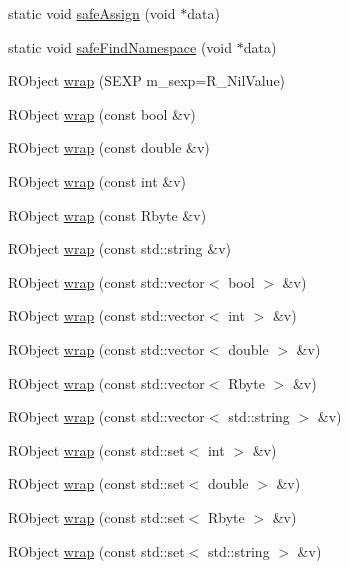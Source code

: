 \begin{DoxyCompactItemize}
\item 
static void \hyperlink{namespaceRcpp_a2d80463328ec91b260619bbe65c50f5e}{safeAssign} (void $\ast$data)
\item 
static void \hyperlink{namespaceRcpp_a669f9e0719ba170ec1b3b5dd2ba45406}{safeFindNamespace} (void $\ast$data)
\item 
RObject \hyperlink{namespaceRcpp_aa47be58d105b733ced235de53b5691af}{wrap} (SEXP m\_\-sexp=R\_\-NilValue)
\item 
RObject \hyperlink{namespaceRcpp_afec8977a6c3fcfc0ab37a9e2a7ba9657}{wrap} (const bool \&v)
\item 
RObject \hyperlink{namespaceRcpp_a4736ca32ac9aef778a1cddf60171fd9c}{wrap} (const double \&v)
\item 
RObject \hyperlink{namespaceRcpp_a0a7e3f2732cf247f3d1f0bf005fe5ad9}{wrap} (const int \&v)
\item 
RObject \hyperlink{namespaceRcpp_a81f3e14c61a58be59803f3100700ea94}{wrap} (const Rbyte \&v)
\item 
RObject \hyperlink{namespaceRcpp_a4d366d399dd494d6790a4c18def9e9a9}{wrap} (const std::string \&v)
\item 
RObject \hyperlink{namespaceRcpp_aa6bc1230d4222365a0ffe0af4cf7fe1a}{wrap} (const std::vector$<$ bool $>$ \&v)
\item 
RObject \hyperlink{namespaceRcpp_ac7ca672bde8965aacab47395102069e4}{wrap} (const std::vector$<$ int $>$ \&v)
\item 
RObject \hyperlink{namespaceRcpp_add0776494532ff31ee34f89ead80b15f}{wrap} (const std::vector$<$ double $>$ \&v)
\item 
RObject \hyperlink{namespaceRcpp_a8dfe3bacd7033e5edcc9341a8de47132}{wrap} (const std::vector$<$ Rbyte $>$ \&v)
\item 
RObject \hyperlink{namespaceRcpp_a054f4cfb15317bdce6b30efa30f0e2ea}{wrap} (const std::vector$<$ std::string $>$ \&v)
\item 
RObject \hyperlink{namespaceRcpp_af1fb1519713bb98d753ce69fe55b9b7d}{wrap} (const std::set$<$ int $>$ \&v)
\item 
RObject \hyperlink{namespaceRcpp_ad3b81d79ed0de1834ea38f995ad39f31}{wrap} (const std::set$<$ double $>$ \&v)
\item 
RObject \hyperlink{namespaceRcpp_ab9e1f40cf7583da1f54a8e6c5f7e9f3a}{wrap} (const std::set$<$ Rbyte $>$ \&v)
\item 
RObject \hyperlink{namespaceRcpp_af6e357808cee5d58e137867916b1d04c}{wrap} (const std::set$<$ std::string $>$ \&v)
\end{DoxyCompactItemize}


